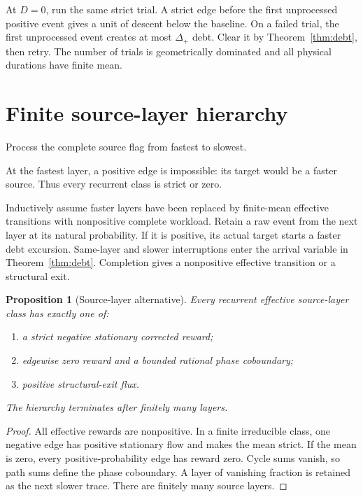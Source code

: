 \documentclass[11pt]{article}
\newtheorem{proposition}[theorem]{Proposition}
\begin{document}
At \(D=0\), run the same strict trial.  A strict edge before the first
unprocessed positive event gives a unit of descent below the baseline.  On a
failed trial, the first unprocessed event creates at most \(\Delta_+\) debt.
Clear it by Theorem~\ref{thm:debt}, then retry.  The number of trials is
geometrically dominated and all physical durations have finite mean.

\section{Finite source-layer hierarchy}

Process the complete source flag from fastest to slowest.

At the fastest layer, a positive edge is impossible: its target would be a
faster source.  Thus every recurrent class is strict or zero.

Inductively assume faster layers have been replaced by finite-mean effective
transitions with nonpositive complete workload.  Retain a raw event from the
next layer at its natural probability.  If it is positive, its actual target
starts a faster debt excursion.  Same-layer and slower interruptions enter
the arrival variable in Theorem~\ref{thm:debt}.  Completion gives a
nonpositive effective transition or a structural exit.

\begin{proposition}[Source-layer alternative]\label{prop:layers}
Every recurrent effective source-layer class has exactly one of:
\begin{enumerate}[label=(\roman*)]
\item a strict negative stationary corrected reward;
\item edgewise zero reward and a bounded rational phase coboundary;
\item positive structural-exit flux.
\end{enumerate}
The hierarchy terminates after finitely many layers.
\end{proposition}

\begin{proof}
All effective rewards are nonpositive.  In a finite irreducible class, one
negative edge has positive stationary flow and makes the mean strict.
If the mean is zero, every positive-probability edge has reward zero.  Cycle
sums vanish, so path sums define the phase coboundary.  A layer of vanishing
fraction is retained as the next slower trace.  There are finitely many
source layers.
\end{proof}
\end{document}
